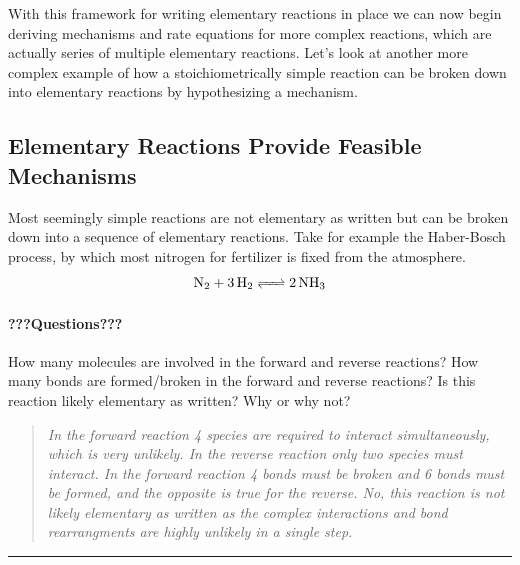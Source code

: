 \documentclass[
]{article}
\begin{document}
With this framework for writing elementary reactions in place we can now begin deriving mechanisms and rate equations for more complex reactions, which are actually series of multiple elementary reactions. Let's look at another more complex example of how a stoichiometrically simple reaction can be broken down into elementary reactions by hypothesizing a mechanism.

\hypertarget{elementary-reactions-provide-feasible-mechanisms}{%
\subsection{Elementary Reactions Provide Feasible Mechanisms}\label{elementary-reactions-provide-feasible-mechanisms}}

Most seemingly simple reactions are not elementary as written but can be broken down into a sequence of elementary reactions. Take for example the Haber-Bosch process, by which most nitrogen for fertilizer is fixed from the atmosphere.
\[ \ce{N2 + 3H2 <=> 2NH3} \]

\hypertarget{questions-7}{%
\paragraph{???Questions???}\label{questions-7}}

How many molecules are involved in the forward and reverse reactions?
How many bonds are formed/broken in the forward and reverse reactions? Is this reaction likely elementary as written? Why or why not?

\begin{quote}
\emph{In the forward reaction 4 species are required to interact simultaneously, which is very unlikely. In the reverse reaction only two species must interact. In the forward reaction 4 bonds must be broken and 6 bonds must be formed, and the opposite is true for the reverse. No, this reaction is not likely elementary as written as the complex interactions and bond rearrangments are highly unlikely in a single step.}
\end{quote}

\begin{center}\rule{0.5\linewidth}{0.5pt}\end{center}
\end{document}
